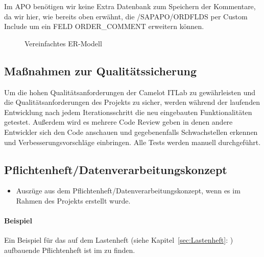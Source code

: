 Im APO benötigen wir keine Extra Datenbank zum Speichern der Kommentare, da wir hier, wie bereits oben erwähnt, die /SAPAPO/ORDFLDS per Custom Include um ein FELD ORDER\_COMMENT erweitern können.  

\begin{figure}[htb]
	\centering
	\caption{Vereinfachtes ER-Modell}
	\label{fig:APO01}
\end{figure} 

\subsection{Maßnahmen zur Qualitätssicherung}
\label{sec:Qualitaetssicherung}
Um die hohen Qualitätsanforderungen der Camelot ITLab zu gewährleisten und die Qualitätsanforderungen des Projekts zu sicher, werden während der laufenden Entwicklung nach jedem Iterationsschritt die neu eingebauten Funktionalitäten getestet. Außerdem wird es mehrere Code Review geben in denen andere Entwickler sich den Code anschauen und gegebenenfalls Schwachstellen erkennen und Verbesserungsvorschläge einbringen. Alle Tests werden manuell durchgeführt.  


\subsection{Pflichtenheft/Datenverarbeitungskonzept}
\label{sec:Pflichtenheft}
\begin{itemize}
	\item Auszüge aus dem Pflichtenheft/Datenverarbeitungskonzept, wenn es im Rahmen des Projekts erstellt wurde.
\end{itemize}

\paragraph{Beispiel}
Ein Beispiel für das auf dem Lastenheft (siehe Kapitel~\ref{sec:Lastenheft}: ) aufbauende Pflichtenheft ist im  zu finden.



